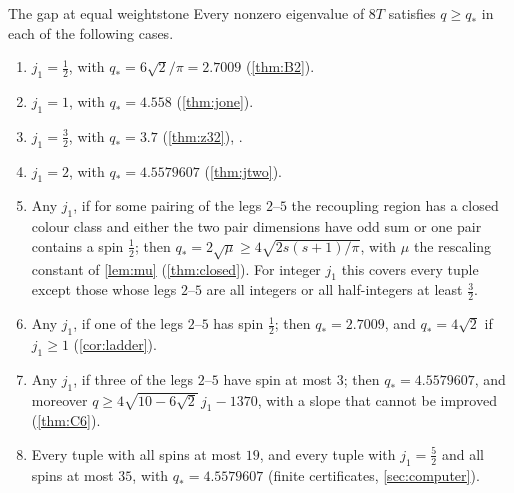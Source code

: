 \begin{theorem}{The gap at equal weights}{tone}
Every nonzero eigenvalue of $8T$ satisfies $q\ge q_*$ in each of the following cases.
\begin{enumerate}
\item[(a)] $j_1=\frac12$, with $q_*=6\sqrt2/\pi=2.7009$ \textup{(}\cref{thm:B2}\textup{)}.
\item[(b)] $j_1=1$, with $q_*=4.558$ \textup{(}\cref{thm:jone}\textup{)}.
\item[(c)] $j_1=\frac32$, with $q_*=3.7$ \textup{(}\cref{thm:z32}\textup{)}, \zstatus.
\item[(d)] $j_1=2$, with $q_*=4.5579607$ \textup{(}\cref{thm:jtwo}\textup{)}.
\item[(e)] Any $j_1$, if for some pairing of the legs $2$--$5$ the recoupling region has a
  closed colour class and either the two pair dimensions have odd sum or one pair
  contains a spin $\frac12$; then $q_*=2\sqrt\mu\ge4\sqrt{2s(s+1)/\pi}$, with $\mu$ the
  rescaling constant of \cref{lem:mu}
  \textup{(}\cref{thm:closed}\textup{)}. For integer $j_1$ this covers every tuple
  except those whose legs $2$--$5$ are all integers or all half-integers at least
  $\frac32$.
\item[(f)] Any $j_1$, if one of the legs $2$--$5$ has spin $\frac12$; then $q_*=2.7009$,
  and $q_*=4\sqrt2$ if $j_1\ge1$ \textup{(}\cref{cor:ladder}\textup{)}.
\item[(g)] Any $j_1$, if three of the legs $2$--$5$ have spin at most $3$; then
  $q_*=4.5579607$, and moreover $q\ge4\sqrt{10-6\sqrt2}\,j_1-1370$, with a slope that
  cannot be improved \textup{(}\cref{thm:C6}\textup{)}.
\item[(h)] Every tuple with all spins at most $19$, and every tuple with $j_1=\frac52$ and
  all spins at most $35$, with $q_*=4.5579607$ \textup{(}finite certificates,
  \cref{sec:computer}\textup{)}.
\end{enumerate}
\end{theorem}

